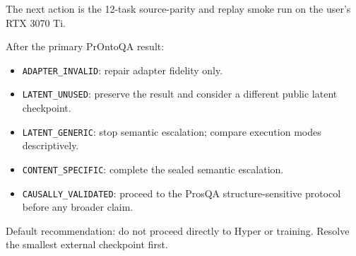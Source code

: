 \documentclass[
  10pt,
]{article}
\providecommand{\tightlist}{%
  \setlength{\itemsep}{0pt}\setlength{\parskip}{0pt}}
\begin{document}
The next action is the 12-task source-parity and replay smoke run on the
user's RTX 3070 Ti.

After the primary PrOntoQA result:

\begin{itemize}
\tightlist
\item
  \texttt{ADAPTER\_INVALID}: repair adapter fidelity only.
\item
  \texttt{LATENT\_UNUSED}: preserve the result and consider a different
  public latent checkpoint.
\item
  \texttt{LATENT\_GENERIC}: stop semantic escalation; compare execution
  modes descriptively.
\item
  \texttt{CONTENT\_SPECIFIC}: complete the sealed semantic escalation.
\item
  \texttt{CAUSALLY\_VALIDATED}: proceed to the ProsQA
  structure-sensitive protocol before any broader claim.
\end{itemize}

Default recommendation: do not proceed directly to Hyper or training.
Resolve the smallest external checkpoint first.
\end{document}
